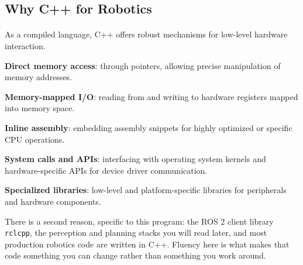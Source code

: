 \documentclass[
    10pt,
    dvipsnames,
    svgnames,
    x11names,
    aspectratio=1610,
    english,
    codeminted]{beamer}
\begin{document}
\subsection*{Why C++ for Robotics}
\begingroup
\divframetrue
\renewcommand{\divbartextA}{\secname}
\renewcommand{\divbartextB}{}
\begin{frame}{\secname}
  \divbar{\secname}{\subsecname}
  \framesubtitle{\subsecname}

As a compiled language, C++ offers robust mechanisms for low-level hardware interaction.

\begin{compactitem}
\small
    \item \textbf{Direct memory access}: through pointers, allowing precise manipulation of memory addresses.
    \item \textbf{Memory-mapped I/O}: reading from and writing to hardware registers mapped into memory space.
    \item \textbf{Inline assembly}: embedding assembly snippets for highly optimized or specific CPU operations.
    \item \textbf{System calls and APIs}: interfacing with operating system kernels and hardware-specific APIs for device driver communication.
    \item \textbf{Specialized libraries}: low-level and platform-specific libraries for peripherals and hardware components.
\end{compactitem}

\medskip
\begin{MyBox}
There is a second reason, specific to this program: the ROS 2 client library \texttt{rclcpp}, the perception and planning stacks you will read later, and most production robotics code are written in C++. Fluency here is what makes that code something you can change rather than something you work around.
\end{MyBox}
\end{frame}
\endgroup
\end{document}
